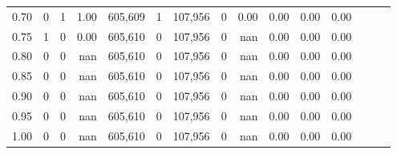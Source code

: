\begin{tabular}{rrrrrrrrrrrrrrr}
0.70 &        0 &       1 &  1.00 &  605,609 &        1 &  107,956 &        0 &  0.00 &  0.00 &  0.00 &      0.00 \\
0.75 &        1 &       0 &  0.00 &  605,610 &        0 &  107,956 &        0 &   nan &  0.00 &  0.00 &      0.00 \\
0.80 &        0 &       0 &   nan &  605,610 &        0 &  107,956 &        0 &   nan &  0.00 &  0.00 &      0.00 \\
0.85 &        0 &       0 &   nan &  605,610 &        0 &  107,956 &        0 &   nan &  0.00 &  0.00 &      0.00 \\
0.90 &        0 &       0 &   nan &  605,610 &        0 &  107,956 &        0 &   nan &  0.00 &  0.00 &      0.00 \\
0.95 &        0 &       0 &   nan &  605,610 &        0 &  107,956 &        0 &   nan &  0.00 &  0.00 &      0.00 \\
1.00 &        0 &       0 &   nan &  605,610 &        0 &  107,956 &        0 &   nan &  0.00 &  0.00 &      0.00 \\
\bottomrule
\end{tabular}
